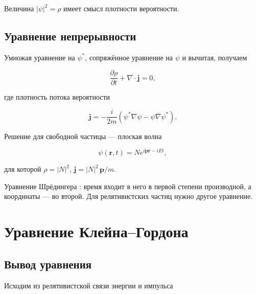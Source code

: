 \documentclass[../final.tex]{subfiles}
\begin{document}
Величина $|\psi|^2=\rho$ имеет смысл плотности вероятности.


\subsection{Уравнение непрерывности}

Умножая уравнение на $\psi^*$, сопряжённое уравнение на $\psi$
и вычитая, получаем 

\begin{equation*}
    \frac{\partial\rho}{\partial t}
    +
    \nabla\cdot\mathbf j
    =
    0,
\end{equation*}

где плотность потока вероятности

\begin{equation*}
    \mathbf j
    =
    -\frac{i}{2m}
    \left(
        \psi^*\nabla\psi
        -
        \psi\nabla\psi^*
    \right).
\end{equation*}

Решение для свободной частицы --- плоская волна

\begin{equation*}
    \psi(\mathbf r,t)
    =
    N e^{i\mathbf p\mathbf r-iEt},
\end{equation*}

для которой $\rho=|N|^2$, $\mathbf j=|N|^2\,\mathbf p/m$.

\remark
Уравнение Шрёдингера :
время входит в него в первой степени производной, а координаты ---
во второй. Для релятивистских частиц нужно другое уравнение.


\section{Уравнение Клейна--Гордона}

\subsection{Вывод уравнения}

Исходим из релятивистской связи энергии и импульса
\end{document}
